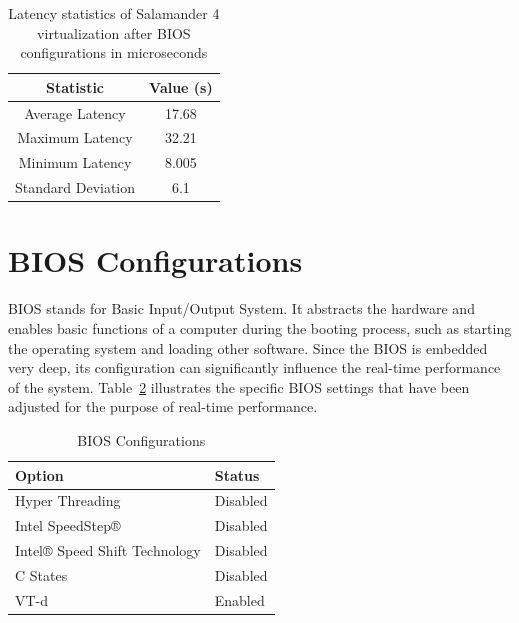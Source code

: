 \documentclass[MMR,Master,english]{twbook}
\begin{document}
\begin{table}[H]
	\centering
	\caption[Latency statistics of Salamander 4 after BIOS configurations]{Latency statistics of Salamander 4 virtualization after BIOS configurations in microseconds}
	\label{tab:latency_statistics_bios}
	\setlength{\tabcolsep}{0.5em} %
	{\renewcommand{\arraystretch}{1.2}%
		\begin{tabular}{|c|c|}\hline
			\textbf{Statistic} & \textbf{Value (\textmu s)} \\\hline
			Average Latency    & 17.68                      \\\hline
			Maximum Latency    & 32.21                      \\\hline
			Minimum Latency    & 8.005                      \\\hline
			Standard Deviation & 6.1                        \\\hline
		\end{tabular}}
\end{table}



\section{BIOS Configurations}\label{sec:bios_configurations}

BIOS stands for Basic Input/Output System. It abstracts the hardware and enables basic functions of a computer during the booting process, such as starting the operating system and loading other software. Since the BIOS is embedded very deep, its configuration can significantly influence the real-time performance of the system. Table~\ref{tab:bios_configuration} illustrates the specific BIOS settings that have been adjusted for the purpose of real-time performance.

\begin{table}[H]
	\centering
	\caption{BIOS Configurations}
	\label{tab:bios_configuration}
	\setlength{\tabcolsep}{0.5em} %
	{\renewcommand{\arraystretch}{1.2}%
		\begin{tabular}{|l|l|}
			\hline
			\textbf{Option}               & \textbf{Status} \\
			\hline
			Hyper Threading               & Disabled        \\
			\hline
			Intel SpeedStep®              & Disabled        \\
			\hline
			Intel® Speed Shift Technology & Disabled        \\
			\hline
			C States                      & Disabled        \\
			\hline
			VT-d                          & Enabled         \\
			\hline
		\end{tabular}}
\end{table}
\end{document}

